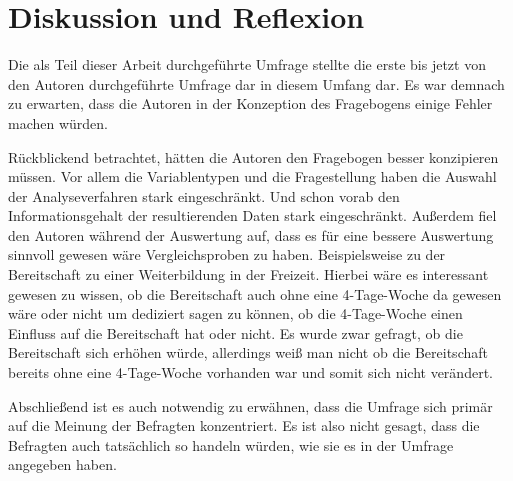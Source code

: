 \chapter{Diskussion und Reflexion}


Die als Teil dieser Arbeit durchgeführte Umfrage stellte die erste bis jetzt von den Autoren durchgeführte
Umfrage dar in diesem Umfang dar. Es war demnach zu erwarten, dass die Autoren in der Konzeption des Fragebogens
einige Fehler machen würden. 

Rückblickend betrachtet, hätten die Autoren den Fragebogen besser konzipieren müssen.
Vor allem die Variablentypen und die Fragestellung haben die Auswahl der Analyseverfahren stark eingeschränkt. Und schon
vorab den Informationsgehalt der resultierenden Daten stark eingeschränkt.
Außerdem fiel den Autoren während der Auswertung auf, dass es für eine bessere Auswertung sinnvoll gewesen wäre 
Vergleichsproben zu haben. Beispielsweise zu der Bereitschaft zu einer Weiterbildung in der Freizeit. 
Hierbei wäre es interessant gewesen zu wissen, ob die Bereitschaft auch ohne eine 4-Tage-Woche da gewesen 
wäre oder nicht um dediziert sagen zu können, ob die 4-Tage-Woche einen Einfluss auf die Bereitschaft hat oder nicht.
Es wurde zwar gefragt, ob die Bereitschaft sich erhöhen würde, allerdings weiß man nicht
ob die Bereitschaft bereits ohne eine 4-Tage-Woche vorhanden war und somit sich nicht verändert.

Abschließend ist es auch notwendig zu erwähnen, dass die Umfrage sich primär auf die Meinung der Befragten konzentriert.
Es ist also nicht gesagt, dass die Befragten auch tatsächlich so handeln würden, wie sie es in der Umfrage angegeben haben.


